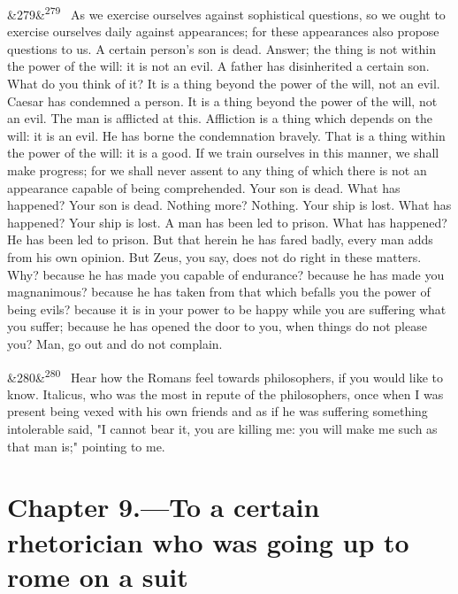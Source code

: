 \documentclass[12pt]{article}
\newcommand{\para}[1][]{\par\noindent\ifx&#1&\else\textsuperscript{\footnotesize #1}~\fi}
\begin{document}
\para[279] As we exercise ourselves against sophistical questions, so we ought to exercise ourselves daily against appearances; for these appearances also propose questions to us. A certain person's son is dead. Answer; the thing is not within the power of the will: it is not an evil. A father has disinherited a certain son. What do you think of it? It is a thing beyond the power of the will, not an evil. Caesar has condemned a person. It is a thing beyond the power of the will, not an evil. The man is afflicted at this. Affliction is a thing which depends on the will: it is an evil. He has borne the condemnation bravely. That is a thing within the power of the will: it is a good. If we train ourselves in this manner, we shall make progress; for we shall never assent to any thing of which there is not an appearance capable of being comprehended. Your son is dead. What has happened? Your son is dead. Nothing more? Nothing. Your ship is lost. What has happened? Your ship is lost. A man has been led to prison. What has happened? He has been led to prison. But that herein he has fared badly, every man adds from his own opinion. But Zeus, you say, does not do right in these matters. Why? because he has made you capable of endurance? because he has made you magnanimous? because he has taken from that which befalls you the power of being evils? because it is in your power to be happy while you are suffering what you suffer; because he has opened the door to you, when things do not please you? Man, go out and do not complain.

\para[280] Hear how the Romans feel towards philosophers, if you would like to know. Italicus, who was the most in repute of the philosophers, once when I was present being vexed with his own friends and as if he was suffering something intolerable said, "I cannot bear it, you are killing me: you will make me such as that man is;" pointing to me.

\section*{Chapter 9.---To a certain rhetorician who was going up to rome on a suit}
\end{document}
